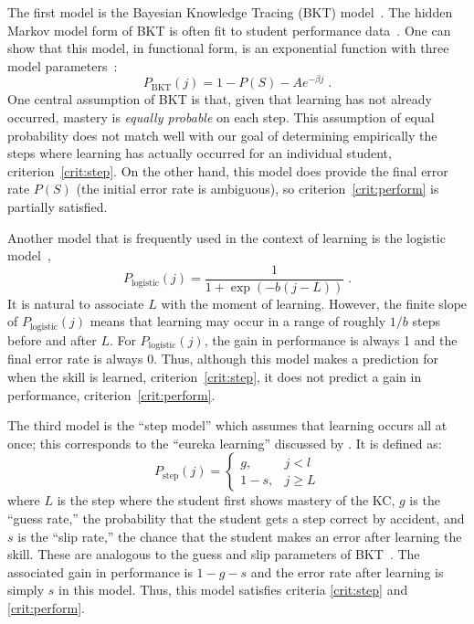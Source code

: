 \documentclass{edm_template}
\begin{document}
The first model is the Bayesian Knowledge Tracing (BKT) 
model~\cite{corbett_knowledge_1995}.  The hidden Markov model
form of BKT is often fit to student performance 
data~\cite{beck_identifiability:_2007}.  One can show that
this model, in functional form, is an exponential function
with three model parameters~\cite{van_de_sande_properties_2012}:
%
\begin{equation}
         P_\mathrm{BKT}(j) = 1-P(S) -A e^{-\beta j} \; .
\end{equation}
%
One central assumption of BKT is that, given that learning
has not already occurred, mastery is {\em equally probable} on each step.
This assumption of equal probability does not match well with 
our goal of determining empirically the steps where learning has 
actually occurred for an individual student, criterion~\ref{crit:step}.
On the other hand, this model does provide the final
error rate $P(S)$ (the initial error rate is ambiguous), 
so criterion~\ref{crit:perform} is partially satisfied. 

Another model that is frequently used in the context of learning is
the logistic model~\cite{cen_learning_2006,chi_instructional_2011},
%
\begin{equation}
    P_\mathrm{logistic}(j)= \frac{1}{1+\exp\left(-b (j-L)\right)} \; .
\end{equation}
%
It is natural to associate $L$ with the moment of learning.  However,
the finite slope of $P_\mathrm{logistic}(j)$ means that learning may
occur in a range of roughly $1/b$ steps before and after $L$.  For
$P_\mathrm{logistic}(j)$, the gain in performance is always 1 and the
final error rate is always 0.  Thus, although this model makes a
prediction for when the skill is learned, criterion~\ref{crit:step},
it does not predict a gain in performance,
criterion~\ref{crit:perform}.

The third model is the ``step model'' which assumes that learning 
occurs all at once; this corresponds to the ``eureka learning''
discussed by \cite{baker_detecting_2011}.  It is defined as:
%
\begin{equation}
    P_\mathrm{step}(j)= \left\{\begin{array}{cc}
                 g, & j<l \\
                 1-s, & j\ge L 
                 \end{array} \right. 
\end{equation}
%
where $L$ is the step where the student first shows mastery of the KC,
$g$ is the ``guess rate,'' the probability that the student gets a
step correct by accident, and $s$ is the ``slip rate,'' the chance
that the student makes an error after learning the skill.  These are
analogous to the guess and slip parameters of
BKT~\cite{corbett_knowledge_1995}.  The associated gain in performance
is $1-g-s$ and the error rate after learning is simply $s$ in this
model.  Thus, this model satisfies criteria \ref{crit:step} and
\ref{crit:perform}.
\end{document}

